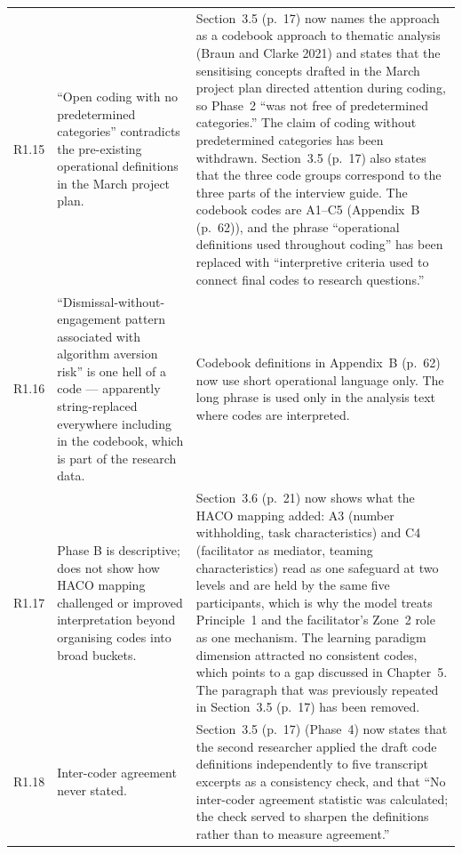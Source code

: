 \documentclass[12pt,a4paper,twoside]{article}
\begin{document}
{\begin{longtable}{p{1cm}p{6.7cm}p{7cm}}
R1.15 &
``Open coding with no predetermined categories'' contradicts the pre-existing
operational definitions in the March project plan. &
Section~3.5 (p.~17) now names the approach as a codebook approach to thematic analysis (Braun and Clarke 2021) and states that the sensitising concepts drafted in the March project plan directed attention during coding, so Phase~2 ``was not free of predetermined categories.'' The claim of coding without predetermined categories has been withdrawn. Section~3.5 (p.~17) also states that the three code groups correspond to the three parts of the interview guide. The codebook codes are A1--C5 (Appendix~B (p.~62)), and the phrase ``operational definitions used throughout coding'' has been replaced with ``interpretive criteria used to connect final codes to research questions.'' \\

R1.16 &
``Dismissal-without-engagement pattern associated with algorithm aversion risk'' is
one hell of a code --- apparently string-replaced everywhere including in the codebook,
which is part of the research data. &
Codebook definitions in Appendix~B (p.~62) now use short operational language only. The long
phrase is used only in the analysis text where codes are interpreted. \\

R1.17 &
Phase B is descriptive; does not show how HACO mapping challenged or improved
interpretation beyond organising codes into broad buckets. &
Section~3.6 (p.~21) now shows what the HACO mapping added: A3 (number withholding, task characteristics) and C4 (facilitator as mediator, teaming characteristics) read as one safeguard at two levels and are held by the same five participants, which is why the model treats Principle~1 and the facilitator's Zone~2 role as one mechanism. The learning paradigm dimension attracted no consistent codes, which points to a gap discussed in Chapter~5. The paragraph that was previously repeated in Section~3.5 (p.~17) has been removed. \\

R1.18 &
Inter-coder agreement never stated. &
Section~3.5 (p.~17) (Phase~4) now states that the second researcher applied the draft code definitions independently to five transcript excerpts as a consistency check, and that ``No inter-coder agreement statistic was calculated; the check served to sharpen the definitions rather than to measure agreement.'' \\


\end{longtable}}
\end{document}
